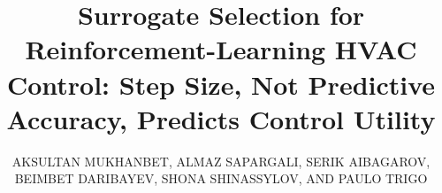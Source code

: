 \documentclass{ieeeaccess}
\begin{document}

\title{Surrogate Selection for Reinforcement-Learning HVAC Control:
Step Size, Not Predictive Accuracy, Predicts Control Utility}

\author{\uppercase{Aksultan Mukhanbet},
\uppercase{Almaz Sapargali},
\uppercase{Serik Aibagarov},
\uppercase{Beimbet Daribayev},
\uppercase{Shona Shinassylov},
AND \uppercase{Paulo Trigo}}

\address[1]{Al-Farabi Kazakh National University, Almaty 050040, Kazakhstan
(e-mail: mukhanbet.aksultan@kaznu.kz)}
\address[2]{LLP Digit Alem, Almaty, Kazakhstan (e-mail:
almaz.sapargali2001@gmail.com; aibagarov\_serik@kaznu.edu.kz;
shona.shinassylov@kaznu.edu.kz)}
\address[3]{Shakarim University, Semey, Abai Region, Kazakhstan (e-mail:
beimbet.daribayev@kaznu.edu.kz)}
\address[4]{Instituto Superior de Engenharia de Lisboa (ISEL), 1959-007 Lisbon,
Portugal (e-mail: paulo.trigo@isel.pt)}


\end{document}
